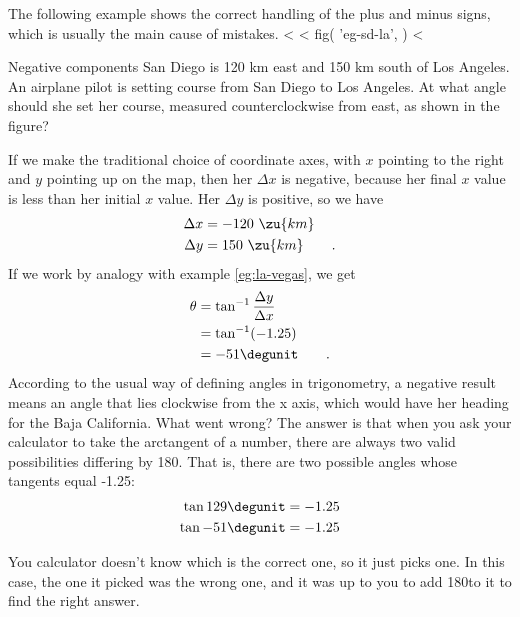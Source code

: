 The following example shows the correct handling of the plus
and minus signs, which is usually the main cause of mistakes.
<%
<%
  fig(
    'eg-sd-la',
  )
<%
\begin{eg}{Negative components}\label{eg:sd-la}
\egquestion San Diego is 120 km east and 150 km south of Los
Angeles. An airplane pilot is setting course from San Diego
to Los Angeles. At what angle should she set her course,
measured counterclockwise from east, as shown in the figure?

\eganswer If we make the traditional choice of coordinate
axes, with $x$ pointing to the right and $y$ pointing up on
the map, then her $\Delta x$ is negative, because her final
$x$ value is less than her initial $x$ value. Her $\Delta y$
is positive, so we have
\begin{align*}
        \Delta x      &=  -120\ \zu{km}  \\
        \Delta y     &=  150\ \zu{km}   \qquad   .
\end{align*}
If we work by analogy with example \ref{eg:la-vegas}, we get
\begin{align*}
        \theta &= \tan^{-1}\frac{\Delta y}{\Delta x} \\
             &= \tan^{-1}(-1.25) \\
             &=  -51\degunit   \qquad   .
\end{align*}
According to the usual way of defining angles in trigonometry,
a negative result means an angle that lies clockwise from
the x axis, which would have her heading for the Baja
California. What went wrong? The answer is that when you ask
your calculator to take the arctangent of a number, there
are always two valid possibilities differing by 180\degunit.
That is, there are two possible angles whose tangents equal -1.25:
\begin{align*}
        \tan  129\degunit  &=  -1.25  \\
        \tan  -51\degunit  &=  -1.25
\end{align*}

You calculator doesn't know which is the correct one, so it
just picks one. In this case, the one it picked was the
wrong one, and it was up to you to add 180\degunit to it to
find the right answer.
\end{eg}

\vfill

